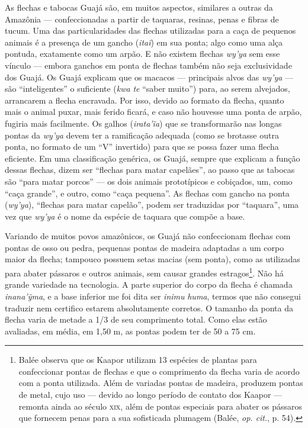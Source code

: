 As flechas e tabocas Guajá são, em muitos aspectos, similares a outras
da Amazônia --- confeccionadas a partir de taquaras, resinas, penas e
fibras de tucum. Uma das particularidades das flechas utilizadas para a
caça de pequenos animais é a presença de um gancho (\emph{itaĩ}) em sua
ponta; algo como uma alça pontuda, exatamente como um arpão. E não
existem flechas \emph{wy'ya} sem esse vínculo --- embora ganchos em ponta
de flechas também não seja exclusividade dos Guajá. Os Guajá explicam
que os macacos --- principais alvos das \emph{wy'ya} --- são ``inteligentes''
o suficiente (\emph{kwa} \emph{te} ``saber muito'') para, ao serem
alvejados, arrancarem a flecha encravada. Por isso, devido ao formato da
flecha, quanto mais o animal puxar, mais ferido ficará, e caso não
houvesse uma ponta de arpão, fugiria mais facilmente. Os galhos
(\emph{irata'ĩa}) que se transformarão nas longas pontas da \emph{wy'ya}
devem ter a ramificação adequada (como se brotasse outra ponta, no
formato de um ``V'' invertido) para que se possa fazer uma flecha
eficiente. Em uma classificação genérica, os Guajá, sempre que explicam
a função dessas flechas, dizem ser ``flechas para matar capelães'', ao
passo que as tabocas são ``para matar porcos'' --- os dois animais
prototípicos e cobiçados, um, como ``caça grande'', e outro, como ``caça
pequena''. As flechas com gancho na ponta (\emph{wy'ya}), ``flechas para
matar capelão'', podem ser traduzidas por ``taquara'', uma vez que
\emph{wy'ya} é o nome da espécie de taquara que compõe a base.

Variando de muitos povos amazônicos, os Guajá não confeccionam flechas
com pontas de osso ou pedra, pequenas pontas de madeira adaptadas a um
corpo maior da flecha; tampouco possuem setas macias (sem ponta), como
as utilizadas para abater pássaros e outros animais, sem causar grandes
estragos\footnote{Balée observa que os Kaapor utilizam 13 espécies de
  plantas para confeccionar pontas de flechas e que o comprimento da
  flecha varia de acordo com a ponta utilizada. Além de variadas pontas
  de madeira, produzem pontas de metal, cujo uso --- devido ao longo
  período de contato dos Kaapor --- remonta ainda ao século \textsc{xix}, além de
  pontas especiais para abater os pássaros que fornecem penas para a sua
  sofisticada plumagem (Balée, \emph{op. cit}., p. 54).}. Não há grande variedade
na tecnologia. A parte superior do corpo da flecha é chamada
\emph{inana'ỹma}, e a base inferior me foi dita ser \emph{inimu}
\emph{huma}, termos que não consegui traduzir nem certifico estarem
absolutamente corretos. O tamanho da ponta da flecha varia de metade a
1/3 de seu comprimento total. Como elas estão avaliadas, em média, em
1,50 m, as pontas podem ter de 50 a 75 cm.

